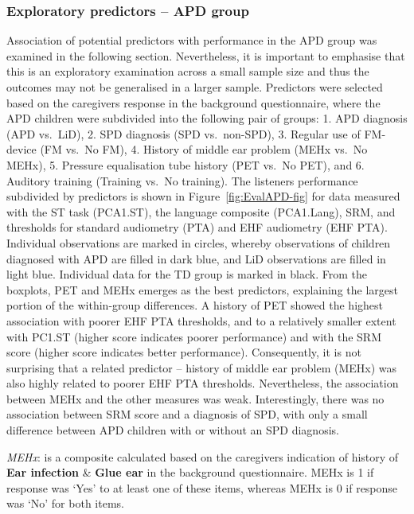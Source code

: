 \documentclass[a4paper, twoside]{templates/ociamthesis}
\begin{document}
\hypertarget{exploratory-predictors-apd-group}{%
\subsubsection{Exploratory predictors -- APD group}\label{exploratory-predictors-apd-group}}

Association of potential predictors with performance in the APD group was examined in the following section. Nevertheless, it is important to emphasise that this is an exploratory examination across a small sample size and thus the outcomes may not be generalised in a larger sample. Predictors were selected based on the caregivers response in the background questionnaire, where the APD children were subdivided into the following pair of groups: 1. APD diagnosis (APD vs.~LiD), 2. SPD diagnosis (SPD vs.~non-SPD), 3. Regular use of FM-device (FM vs.~No FM), 4. History of middle ear problem (MEHx vs.~No MEHx), 5. Pressure equalisation tube history (PET vs.~No PET), and 6. Auditory training (Training vs.~No training). The listeners performance subdivided by predictors is shown in Figure~\ref{fig:EvalAPD-fig} for data measured with the ST task (PCA1.ST), the language composite (PCA1.Lang), SRM, and thresholds for standard audiometry (PTA) and EHF audiometry (EHF PTA). Individual observations are marked in circles, whereby observations of children diagnosed with APD are filled in dark blue, and LiD observations are filled in light blue. Individual data for the TD group is marked in black. From the boxplots, PET and MEHx emerges as the best predictors, explaining the largest portion of the within-group differences. A history of PET showed the highest association with poorer EHF PTA thresholds, and to a relatively smaller extent with PC1.ST (higher score indicates poorer performance) and with the SRM score (higher score indicates better performance). Consequently, it is not surprising that a related predictor -- history of middle ear problem (MEHx) was also highly related to poorer EHF PTA thresholds. Nevertheless, the association between MEHx and the other measures was weak. Interestingly, there was no association between SRM score and a diagnosis of SPD, with only a small difference between APD children with or without an SPD diagnosis.\\

\begin{correction}
\emph{MEHx}: is a composite calculated based on the caregivers
indication of history of \textbf{Ear infection} \& \textbf{Glue ear} in
the background questionnaire. MEHx is 1 if response was `Yes' to at
least one of these items, whereas MEHx is 0 if response was `No' for
both items.
\end{correction}
\end{document}
